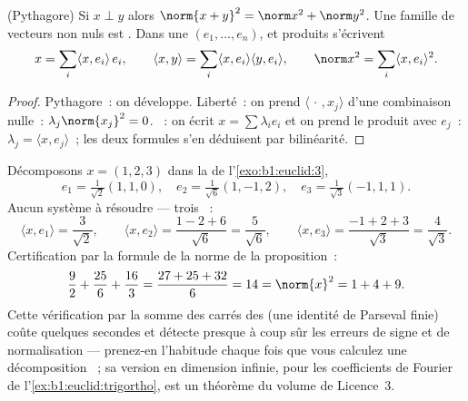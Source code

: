 \begin{proposition}\label{prop:b1:euclid:orthfree}
(Pythagore) Si $x \perp y$ alors
$\norm{x+y}^2 = \norm x^2 + \norm y^2$. Une famille  de
vecteurs non nuls est . Dans une   $(e_1,
\dots, e_n)$,  et produits s'écrivent
\[
x = \sum_{i} \langle x, e_i\rangle\, e_i,
\qquad
\langle x, y \rangle = \sum_i \langle x, e_i\rangle \langle y,
e_i\rangle,
\qquad
\norm x^2 = \sum_i \langle x, e_i\rangle^2 .
\]
\end{proposition}

\begin{proof}
Pythagore~: on développe. Liberté~: on prend $\langle\,\cdot\,,
x_j\rangle$ d'une combinaison nulle~: $\lambda_j \norm{x_j}^2 = 0$.
~: on écrit $x = \sum \lambda_i e_i$ et on prend le
produit avec $e_j$~: $\lambda_j = \langle x, e_j\rangle$~; les deux
formules s'en déduisent par bilinéarité.
\end{proof}

\begin{example}
\label{ex:b1:euclid:parsevalcheck}
Décomposons $x = (1, 2, 3)$ dans la   de
l'\cref{exo:b1:euclid:3},
\[
e_1 = \tfrac{1}{\sqrt2}(1,1,0), \quad
e_2 = \tfrac{1}{\sqrt6}(1,-1,2), \quad
e_3 = \tfrac{1}{\sqrt3}(-1,1,1).
\]
Aucun système à résoudre --- trois ~:
\[
\langle x, e_1\rangle = \frac{3}{\sqrt2},
\qquad
\langle x, e_2\rangle = \frac{1 - 2 + 6}{\sqrt6} =
\frac{5}{\sqrt6},
\qquad
\langle x, e_3\rangle = \frac{-1 + 2 + 3}{\sqrt3} =
\frac{4}{\sqrt3}.
\]
Certification par la formule de la norme de la proposition~:
\[
\frac{9}{2} + \frac{25}{6} + \frac{16}{3}
= \frac{27 + 25 + 32}{6} = 14 = \norm{x}^2 = 1 + 4 + 9 .
\]
Cette vérification par la somme des carrés des  (une
identité de Parseval finie) coûte quelques secondes et détecte
presque à coup sûr les erreurs de signe et de normalisation ---
prenez-en l'habitude chaque fois que vous calculez une
décomposition ~; sa version en dimension infinie, pour
les coefficients de Fourier de l'\cref{ex:b1:euclid:trigortho}, est
un théorème du volume de Licence~3.
\end{example}

